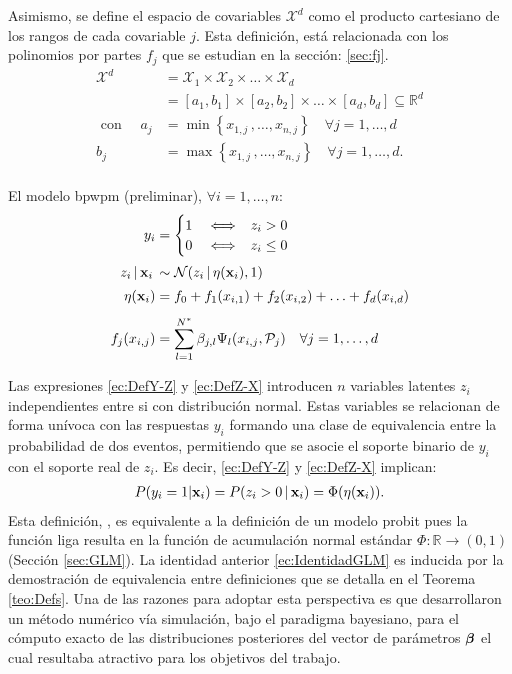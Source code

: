 \documentclass[../Main/Main.tex]{subfiles}
\begin{document}
Asimismo, se define el espacio de covariables $\mathcal{X}^d$ como el producto cartesiano de los rangos de cada covariable $j$. Esta definición, está relacionada con los polinomios por partes $f_j$ que se estudian en la sección: \ref{sec:fj}. 
\begin{align*}
	\mathcal{X}^d &= \mathcal{X}_1\times\mathcal{X}_2\times\ldots\times\mathcal{X}_d\\
	&= [a_1,b_1]\times[a_2,b_2]\times\ldots\times[a_d,b_d] \subseteq \mathbb{R}^d \\ 
\text{ con } \quad  a_j &= \min\left\{x_{1,j}\, ,\ldots,x_{n,j}\right\} \quad \forall j = 1,\ldots,d \\
	b_j &= \max\left\{x_{1,j}\, ,\ldots,x_{n,j}\right\} \quad \forall j = 1,\ldots,d. \\
\end{align*}
\vfill

\pagebreak
\begin{definition} \label{def:BPWPMPrelim}
El modelo bpwpm (preliminar), $\forall i = 1,\ldots,n$: 
\begin{align}
y_i &= 
	\begin{cases}
		1 & \iff \enspace z_i > 0 \\									0 & \iff \enspace z_i \leq 0
	\end{cases} \label{ec:DefY-Z} \\[2pt]
z_i\,|\,\mathbf{x}_i\, &\sim \mathcal{N}(z_i\,|\,\eta(\mathbf{x}_i),1) \label{ec:DefZ-X} \\[2pt]
\eta(\mathbf{x}_i) &= f_0 + f_1(x_{i,1}) + f_2(x_{i,2}) + \ldots + f_d(x_{i,d}) \label{ec:etapred} \\[4pt]
f_j(x_{i,j}) &= \sum_{l = 1}^{N^*} \beta_{j,l} \Psi_l(x_{i,j}, \mathcal{P}_j) \quad \forall j = 1,\ldots,d \label{ec:fj}
\end{align}	
\end{definition}
Las expresiones \eqref{ec:DefY-Z} y \eqref{ec:DefZ-X} introducen $n$ variables latentes $z_i$ independientes entre si con distribución normal. Estas variables se relacionan de forma unívoca con las respuestas $y_i$ formando una clase de equivalencia entre la probabilidad de dos eventos, permitiendo que se asocie el soporte binario de $y_i$ con el soporte real de $z_i$. Es decir, \eqref{ec:DefY-Z} y \eqref{ec:DefZ-X} implican:
\begin{align}
	P(y_i = 1 |\mathbf{x}_i) = P(z_i > 0 \,|\, \mathbf{x}_i) = \Phi(\eta(\mathbf{x}_i)). 	\label{ec:IdentidadGLM}
\end{align}
Esta definición, \citet{albert1993bayesian}, es equivalente a la definición de un modelo probit pues la función liga resulta en la función de acumulación normal estándar $\Phi:\mathbb{R}\rightarrow (0,1)$ (Sección \ref{sec:GLM}). La identidad anterior \eqref{ec:IdentidadGLM} es inducida por la demostración de equivalencia entre definiciones que se detalla en el Teorema \ref{teo:Defs}. Una de las razones para adoptar esta perspectiva es que \citeauthor{albert1993bayesian} desarrollaron un método numérico vía simulación, bajo el paradigma bayesiano, para el cómputo exacto de las distribuciones posteriores del vector de parámetros $\bm{\beta}$ el cual resultaba atractivo para los objetivos del trabajo.
 
\end{document}
